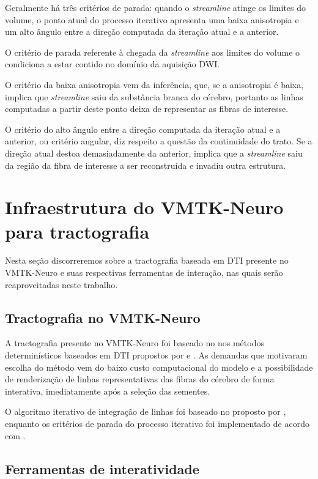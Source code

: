 \documentclass[
    12pt,                %
    oneside,            %
    a4paper,            %
    english,            %
    french,                %
    spanish,            %
    brazil                %
    ]{abntex2}
\begin{document}
Geralmente há três critérios de parada: quando o \textit{streamline} atinge os limites do volume, o ponto atual do processo iterativo apresenta uma baixa anisotropia e um alto ângulo entre a direção computada da iteração atual e a anterior.

O critério de parada referente à chegada da \textit{streamline} aos limites do volume o condiciona a estar contido no domínio da aquisição DWI. 

O critério da baixa anisotropia vem da inferência, que, se a anisotropia é baixa, implica que \textit{streamline} saiu da substância branca do cérebro, portanto as linhas computadas a partir deste ponto deixa de representar as fibras de interesse.

O critério do alto ângulo entre a direção computada da iteração atual e a anterior, ou critério angular, diz respeito a questão da continuidade do trato. Se a direção atual destoa demasiadamente da anterior, implica que a \textit{streamline} saiu da região da fibra de interesse a ser reconstruída e invadiu outra estrutura.


\section{Infraestrutura do VMTK-Neuro para tractografia}

Nesta seção discorreremos sobre a tractografia baseada em DTI presente no VMTK-Neuro e suas respectivas ferramentas de interação, nas quais serão reaproveitadas neste trabalho.

\subsection{Tractografia no VMTK-Neuro}

A tractografia presente no VMTK-Neuro foi baseado no nos métodos determinísticos baseados em DTI propostos por  e . As demandas que motivaram escolha do método vem do baixo custo computacional do modelo e a possibilidade de renderização de linhas representativas das fibras do cérebro de forma interativa, imediatamente após a seleção das sementes.

O algoritmo iterativo de integração de linhas foi baseado no proposto por , enquanto os critérios de parada do processo iterativo foi implementado de acordo com .


\subsection{Ferramentas de interatividade}
\end{document}
